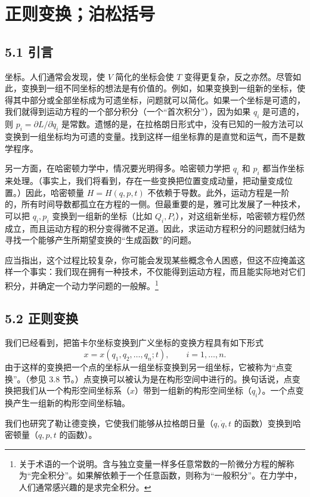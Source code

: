 \chapter{正则变换；泊松括号}
\label{ch:5}

\section*{5.1 引言}

坐标。人们通常会发现，使 $V$ 简化的坐标会使 $T$ 变得更复杂，反之亦然。尽管如此，变换到一组不同坐标的想法是有价值的。例如，如果变换到一组新的坐标，使得其中部分或全部坐标成为可遗坐标，问题就可以简化。如果一个坐标是可遗的，我们就得到运动方程的一个部分积分（一个“首次积分”），因为如果 $q_i$ 是可遗的，则 $p_i = \partial L/\partial \dot{q}_i$ 是常数。遗憾的是，在拉格朗日形式中，没有已知的一般方法可以变换到一组坐标均为可遗的变量。找到这样一组坐标靠的是直觉和运气，而不是数学程序。

另一方面，在哈密顿力学中，情况要光明得多。哈密顿力学把 $q_i$ 和 $p_i$ 都当作坐标来处理。（事实上，我们将看到，存在一些变换把位置变成动量，把动量变成位置。）因此，哈密顿量 $H = H(q, p, t)$ 不依赖于导数。此外，运动方程是一阶的，所有时间导数都孤立在方程的一侧。但最重要的是，雅可比发展了一种技术，可以把 $q_i, p_i$ 变换到一组新的坐标（比如 $Q_i, P_i$），对这组新坐标，哈密顿方程仍然成立，而且运动方程的积分变得微不足道。因此，求运动方程积分的问题就归结为寻找一个能够产生所期望变换的“生成函数”的问题。

应当指出，这个过程比较复杂，你可能会发现某些概念令人困惑，但这不应掩盖这样一个事实：我们现在拥有一种技术，不仅能得到运动方程，而且能实际地对它们积分，并确定一个动力学问题的一般解。\footnote{关于术语的一个说明。含与独立变量一样多任意常数的一阶微分方程的解称为“完全积分”。如果解依赖于一个任意函数，则称为“一般积分”。在力学中，人们通常感兴趣的是求完全积分。}

\section*{5.2 正则变换}

我们已经看到，把笛卡尔坐标变换到广义坐标的变换方程具有如下形式
$$
x = x(q_1, q_2, \dots, q_n; t), \qquad i = 1, \dots, n.
$$
由于这样的变换把一个点的坐标从一组坐标变换到另一组坐标，它被称为“点变换”。（参见 3.8 节。）点变换可以被认为是在构形空间中进行的。换句话说，点变换把我们从一个构形空间坐标系（$x$）带到一组新的构形空间坐标（$q_i$）。一个点变换产生一组新的构形空间坐标轴。

我们也研究了勒让德变换，它使我们能够从拉格朗日量（$q, \dot{q}, t$ 的函数）变换到哈密顿量（$q, p, t$ 的函数）。

